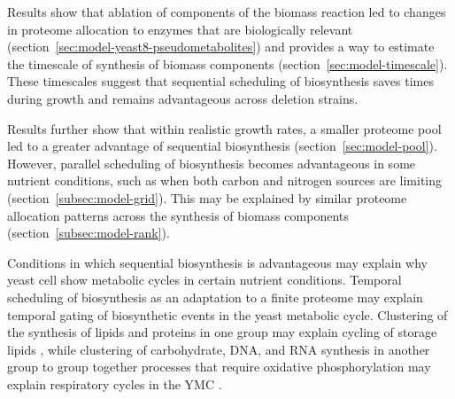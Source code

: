 Results show that ablation of components of the biomass reaction led to changes in proteome allocation to enzymes that are biologically relevant (section~\ref{sec:model-yeast8-pseudometabolites}) and provides a way to estimate the timescale of synthesis of biomass components (section~\ref{sec:model-timescale}).
These timescales suggest that sequential scheduling of biosynthesis saves times during growth and remains advantageous across deletion strains.

Results further show that within realistic growth rates, a smaller proteome pool led to a greater advantage of sequential biosynthesis (section~\ref{sec:model-pool}).
However, parallel scheduling of biosynthesis becomes advantageous in some nutrient conditions, such as when both carbon and nitrogen sources are limiting (section~\ref{subsec:model-grid}).
This may be explained by similar proteome allocation patterns across the synthesis of biomass components (section~\ref{subsec:model-rank}).

Conditions in which sequential biosynthesis is advantageous may explain why yeast cell show metabolic cycles in certain nutrient conditions.
Temporal scheduling of biosynthesis as an adaptation to a finite proteome may explain temporal gating of biosynthetic events in the yeast metabolic cycle.
Clustering of the synthesis of lipids and proteins in one group may explain cycling of storage lipids \parencite{campbellBuildingBlocksAre2020}, while clustering of carbohydrate, DNA, and RNA synthesis in another group to group together processes that require oxidative phosphorylation may explain respiratory cycles in the YMC \parencite{tuLogicYeastMetabolic2005}.
